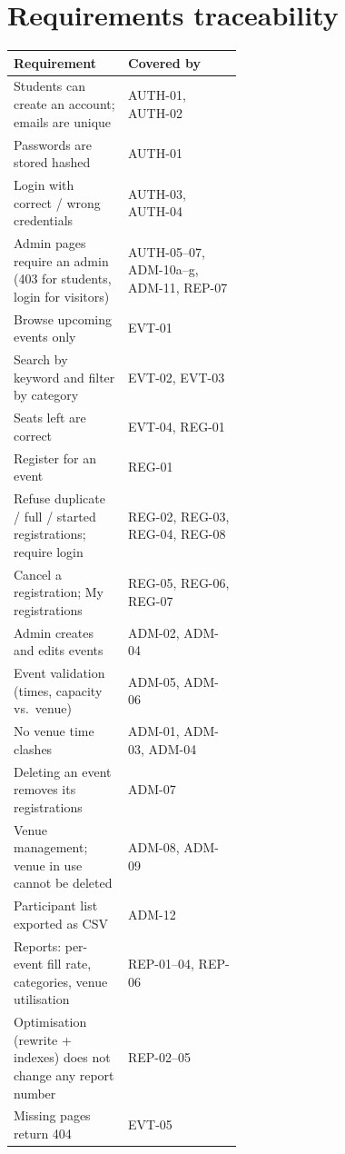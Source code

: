 \documentclass[11pt,a4paper]{article}
\begin{document}
\section{Requirements traceability}

\begin{xltabular}{\linewidth}{@{}>{\raggedright\arraybackslash}p{0.5\linewidth} X@{}}
\toprule
\textbf{Requirement} & \textbf{Covered by} \\
\midrule
\endhead
Students can create an account; emails are unique                    & AUTH-01, AUTH-02 \\
Passwords are stored hashed                                          & AUTH-01 \\
Login with correct / wrong credentials                               & AUTH-03, AUTH-04 \\
Admin pages require an admin (403 for students, login for visitors)  & AUTH-05--07, ADM-10a--g, ADM-11, REP-07 \\
Browse upcoming events only                                          & EVT-01 \\
Search by keyword and filter by category                             & EVT-02, EVT-03 \\
Seats left are correct                                               & EVT-04, REG-01 \\
Register for an event                                                & REG-01 \\
Refuse duplicate / full / started registrations; require login       & REG-02, REG-03, REG-04, REG-08 \\
Cancel a registration; My registrations                              & REG-05, REG-06, REG-07 \\
Admin creates and edits events                                       & ADM-02, ADM-04 \\
Event validation (times, capacity vs.\ venue)                        & ADM-05, ADM-06 \\
No venue time clashes                                                & ADM-01, ADM-03, ADM-04 \\
Deleting an event removes its registrations                          & ADM-07 \\
Venue management; venue in use cannot be deleted                     & ADM-08, ADM-09 \\
Participant list exported as CSV                                     & ADM-12 \\
Reports: per-event fill rate, categories, venue utilisation          & REP-01--04, REP-06 \\
Optimisation (rewrite + indexes) does not change any report number   & REP-02--05 \\
Missing pages return 404                                             & EVT-05 \\
\bottomrule
\end{xltabular}
\end{document}
